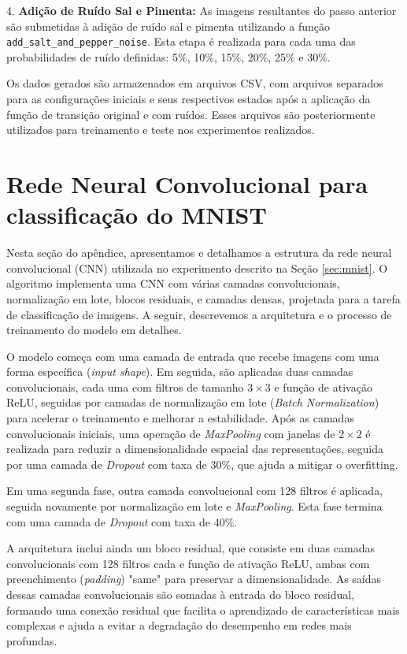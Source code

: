 4. \textbf{Adição de Ruído Sal e Pimenta:} As imagens resultantes do passo anterior são submetidas à adição de ruído sal e pimenta utilizando a função \texttt{add\_salt\_and\_pepper\_noise}. Esta etapa é realizada para cada uma das probabilidades de ruído definidas: 5\%, 10\%, 15\%, 20\%, 25\% e 30\%. 

Os dados gerados são armazenados em arquivos CSV, com arquivos separados para as configurações iniciais e seus respectivos estados após a aplicação da função de transição original e com ruídos. Esses arquivos são posteriormente utilizados para treinamento e teste nos experimentos realizados.

\section{Rede Neural Convolucional para classificação do MNIST}
\label{apsec:cnn}

Nesta seção do apêndice, apresentamos e detalhamos a estrutura da rede neural convolucional (CNN) utilizada no experimento descrito na Seção \ref{sec:mnist}. O algoritmo implementa uma CNN com várias camadas convolucionais, normalização em lote, blocos residuais, e camadas densas, projetada para a tarefa de classificação de imagens. A seguir, descrevemos a arquitetura e o processo de treinamento do modelo em detalhes.

O modelo começa com uma camada de entrada que recebe imagens com uma forma específica (\textit{input shape}). Em seguida, são aplicadas duas camadas convolucionais, cada uma com filtros de tamanho $3 \times 3$ e função de ativação ReLU, seguidas por camadas de normalização em lote (\textit{Batch Normalization}) para acelerar o treinamento e melhorar a estabilidade. Após as camadas convolucionais iniciais, uma operação de \textit{MaxPooling} com janelas de $2 \times 2$ é realizada para reduzir a dimensionalidade espacial das representações, seguida por uma camada de \textit{Dropout} com taxa de 30\%, que ajuda a mitigar o overfitting.

Em uma segunda fase, outra camada convolucional com 128 filtros é aplicada, seguida novamente por normalização em lote e \textit{MaxPooling}. Esta fase termina com uma camada de \textit{Dropout} com taxa de 40\%.

A arquitetura inclui ainda um bloco residual, que consiste em duas camadas convolucionais com 128 filtros cada e função de ativação ReLU, ambas com preenchimento (\textit{padding}) "same" para preservar a dimensionalidade. As saídas dessas camadas convolucionais são somadas à entrada do bloco residual, formando uma conexão residual que facilita o aprendizado de características mais complexas e ajuda a evitar a degradação do desempenho em redes mais profundas.

